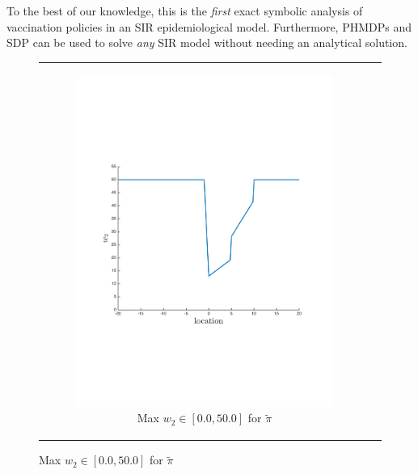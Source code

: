 To the best of our knowledge, this is the \textit{first} exact symbolic analysis of vaccination policies in an SIR epidemiological model. Furthermore, PHMDPs and SDP can be used to solve \textit{any} SIR model without needing an analytical solution.

{\centering
	\begin{figure}[t!]
		\begin{tabular}{cc}
			\begin{subfigure}{0.2\textwidth}\centering\includegraphics[width=\textwidth]{images/robot_opt_new}\caption{Max {\footnotesize $w_2 \in \left[0.0, 50.0 \right]$} for $ \tilde{\pi} $}\label{fig:navigation_opt}\end{subfigure}&            

\end{tabular}
\end{figure}}
